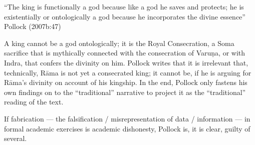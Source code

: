 \begin{myquote}
“The king is functionally a god because like a god he saves and protects; he is existentially or ontologically a god because he incorporates the divine essence”
\hfill Pollock (2007b:47)
\end{myquote}

A king cannot be a god ontologically; it is the Royal Consecration, a Soma sacrifice that is mythically connected with the consecration of Varuṇa, or with Indra, that confers the divinity on him. Pollock writes that it is irrelevant that, technically, Rāma is not yet a consecrated king; it cannot be, if he is arguing for Rāma’s divinity on account of his kingship. In the end, Pollock only fastens his own findings on to the “traditional” narrative to project it as the “traditional” reading of the text. 

If fabrication --- the falsification / misrepresentation of data / information ---  in formal academic exercises is academic dishonesty, Pollock is, it is clear, guilty of several.

